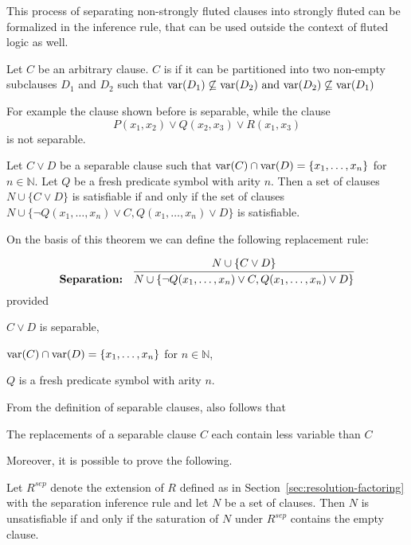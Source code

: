 This process of separating non-strongly fluted clauses into strongly fluted can be formalized in the  inference rule, that can be used outside the context of fluted logic as well.

\begin{definition}
  Let \(C\) be an arbitrary clause. \(C\) is  if it can be partitioned into two non-empty subclauses \(D_1\) and \(D_2\) such that \(\text{var} (D_1) \not\subseteq \text{var} (D_2) \text{ and } \text{var} (D_2) \not\subseteq \text{var} (D_1)\)
\end{definition}

For example the clause shown before is separable, while the clause
\[
P(x_1,x_2) \lor Q(x_2,x_3) \lor R(x_1,x_3)
\]
is not separable.
\begin{theorem}\label{thm:separation}
  Let \(C \lor D\) be a separable clause such that \(\text{var} (C) \cap \text{var} (D) = \{x_1,\ldots,x_n\}\) for \(n \in \mathbb{N}\).
  Let \(Q\) be a fresh predicate symbol with arity \(n\).
  Then a set of clauses \(N \cup \{C\lor D\}\) is satisfiable if and only if the set of clauses \(N \cup \{\neg Q(x_1,\ldots, x_n) \lor C, Q(x_1,\ldots, x_n) \lor D\}\) is satisfiable.
\end{theorem}

On the basis of this theorem we can define the following replacement rule:

\begin{equation}\label{eq:separation-rule}
  \bold{Separation:} \quad \infer{N \cup \{\neg Q(x_1,\ldots, x_n) \lor C, Q(x_1,\ldots, x_n) \lor D\}}{N \cup \{C \lor D\}}
\end{equation}
\indent provided 
\begin{enumerate*}[label = (\roman*)]
  \item \(C \lor D\) is separable,
  \item \(\text{var} (C) \cap \text{var} (D) = \{x_1,\ldots,x_n\}\) for \(n \in \mathbb{N}\),
  \item \(Q\) is \indent a fresh predicate symbol with arity \(n\).
\end{enumerate*}

From the definition of separable clauses, also follows that
\begin{lemma}\label{lem:separation-replacement}
  The replacements of a separable clause \(C\) each contain less variable than \(C\)
\end{lemma}

Moreover, it is possible to prove the following.

\begin{theorem}
  Let \(R^{sep}\) denote the extension of \(R\) defined as in Section~\ref{sec:resolution-factoring} with the separation inference rule and let \(N\) be a set of clauses.
  Then \(N\) is unsatisfiable if and only if the saturation of \(N\) under \(R^{sep}\) contains the empty clause.
\end{theorem}

